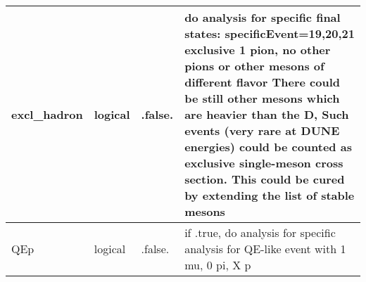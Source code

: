 \documentclass{article}
\begin{document}
\begin{longtable}{llll}
excl\_hadron & \begin{minipage}[t]{2cm}logical\end{minipage} & \begin{minipage}[t]{2cm}.false.\end{minipage} & \begin{minipage}[t]{12cm}do analysis for specific final states: specificEvent=19,20,21 exclusive 1 pion, no other pions or other mesons of different flavor There could be still other mesons which are heavier than the D, Such events (very rare at DUNE energies) could be counted as exclusive single-meson cross section. This could be cured by extending the list of stable mesons\end{minipage}\\*
\midrule
QEp & \begin{minipage}[t]{2cm}logical\end{minipage} & \begin{minipage}[t]{2cm}.false.\end{minipage} & \begin{minipage}[t]{12cm}if .true, do analysis for specific analysis for QE-like event with 1 mu, 0 pi, X p\end{minipage}\\*
\bottomrule
\end{longtable}
{ }



\end{document}
